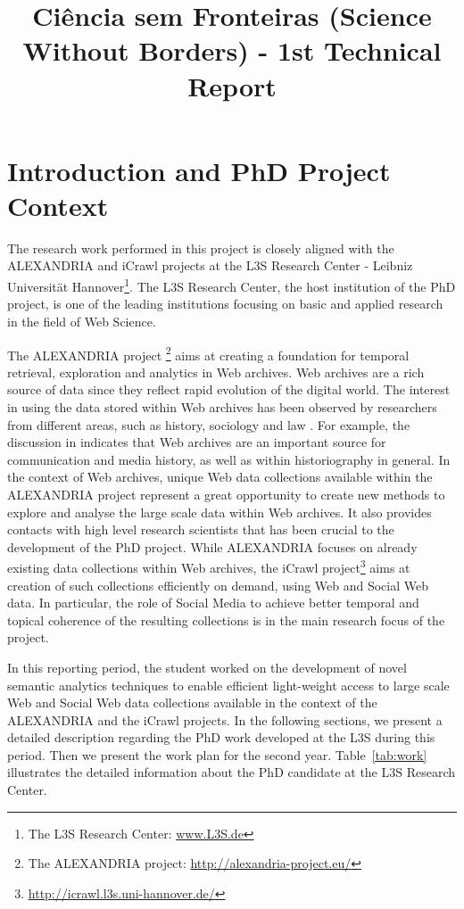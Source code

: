 \documentclass[a4paper,11pt]{report}
\title{Ciência sem Fronteiras (Science Without Borders) - 1st Technical Report}
\begin{document}
\maketitle
\chapter{Introduction and PhD Project Context}

The research work performed in this project is closely aligned with the ALEXANDRIA 
and iCrawl projects at the L3S Research Center -  
Leibniz Universit\"at Hannover\footnote{The L3S Research Center: \url{www.L3S.de}}.  
%
The L3S Research Center, the host institution of the PhD project, 
is one of the leading institutions
focusing on basic and applied research in the field of Web Science.  
% 

The ALEXANDRIA project \footnote{The ALEXANDRIA project: \url{http://alexandria-project.eu/}} 
aims at creating a foundation for temporal retrieval, exploration and analytics in Web archives.
%
Web archives are a rich source of data since they reflect rapid evolution
of the digital world. The interest in using the data
stored within Web archives has been observed by researchers from different
areas, such as history, sociology and law \cite{icrawlRequirements}. For example, 
the discussion in \cite{Brugger14} indicates that Web archives are an important source for
communication and media history, as well as within historiography in general.
%
In the context of Web archives, unique Web data collections available within 
the ALEXANDRIA project represent a great opportunity to create new
methods to explore and analyse the large scale data within Web archives.
It also provides contacts with high level
research scientists that has been crucial to the development of the PhD project.
%
While ALEXANDRIA focuses on already existing data collections within Web archives,
the iCrawl project\footnote{\url{http://icrawl.l3s.uni-hannover.de/}} 
aims at creation of such collections efficiently on demand, 
using Web and Social Web data. In particular, the role of Social Media to achieve
better temporal and topical coherence of the resulting collections is in the  
main research focus of the project.

In this reporting period, the student worked on the development of novel semantic analytics techniques 
to enable efficient light-weight access to large scale Web and Social Web data collections 
available in the context of the ALEXANDRIA and the iCrawl projects. 
%
In the following sections, we present a detailed description regarding the PhD work
developed at the L3S during this period. 
Then we present the work plan for the second year. 
%
Table~\ref{tab:work} illustrates the detailed information about the PhD
candidate at the L3S Research Center.
\end{document}
